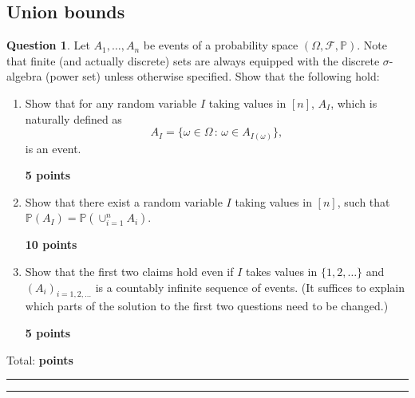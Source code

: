 \documentclass{article}
\DeclareMathOperator*{\1}{\mathbbm{1}}
\newcommand{\bbP}{\mathbb P}
\newcommand{\Prob}[1]{\mathbb{P}( #1 )}
\newcommand{\cF}{\mathcal{F}}
\newcommand{\0}{\mathbf{0}}
\newcounter{DocPoints} %
\newcounter{QuestionPoints} %
\newcommand{\points}[1]{%
	\par\mbox{}\par\noindent\hfill {\bf #1 points}%
	\addtocounter{DocPoints}{#1}
	\addtocounter{QuestionPoints}{#1}
}
\newcommand{\tpoints}[1]{        %
	\ifthenelse{\isempty{#1}}%
	{%
	}%
	{%
		\addtocounter{DocPoints}{#1}
		\addtocounter{QuestionPoints}{#1}
	}													 %
	\par\mbox{}\par\noindent\hfill {Total: \bf \arabic{QuestionPoints}\xspace points}\par\mbox{}\par\hrule\hrule
	\setcounter{QuestionPoints}{0}
}
\theoremstyle{definition}
\newtheorem{question}{Question}
\theoremstyle{remark}
\begin{document}
\subsection*{Union bounds}
\begin{question}
Let $A_1,\dots,A_n$ be events of a probability space $(\Omega,\cF,\bbP)$. Note that finite (and actually discrete) sets are always equipped with the discrete $\sigma$-algebra (power set) unless otherwise specified.
Show that the following hold:
\begin{enumerate}
\item Show that for any random variable $I$ taking values in $[n]$, $A_I$, which is naturally defined as $$A_I = \{ \omega\in \Omega\,:\, \omega \in A_{I(\omega)} \},$$ is an event.
\points{5}
\item Show that there exist a random variable $I$ taking values in $[n]$, such that $\Prob{A_I} = \Prob{\cup_{i=1}^n A_i}$.
\points{10}
\item Show that the first two claims hold even if $I$ takes values in $\{1,2,\dots\}$ and $(A_i)_{i=1,2,\dots}$ is a countably infinite sequence of events. (It suffices to explain which parts of the solution to the first two questions need to be changed.)
\points{5}
\end{enumerate}
\tpoints{}
\end{question}
\end{document}
